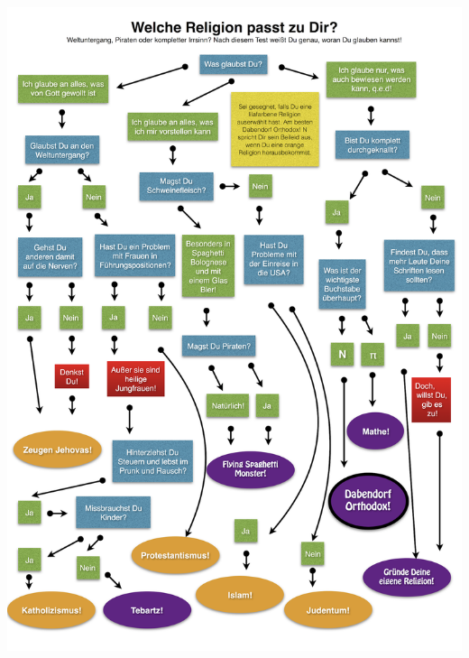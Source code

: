 \clearpage
\vspace*{\fill}
\begin{center}
\includegraphics[width=1\textwidth]{bilder/Anhang_Religionsfrage}
\end{center}
\vspace*{\fill}

